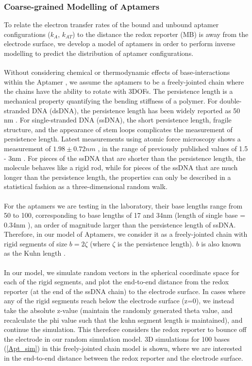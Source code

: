 \subsubsection{Coarse-grained Modelling of Aptamers}
To relate the electron transfer rates of the bound and unbound aptamer configurations ($k_{A}$, $k_{AT}$) to the distance the redox reporter (MB) is away from the electrode surface, we develop a model of aptamers in order to perform inverse modelling to predict the distribution of aptamer configurations.\\\\ 
Without considering chemical or thermodynamic effects of base-interactions within the Aptamer \cite{feigon1996aptamer}, we assume the aptamers to be a freely-jointed chain where the chains have the ability to rotate with 3DOFs.
The persistence length is a mechanical property quantifying the bending stiffness of a polymer. For double-stranded DNA (dsDNA), the persistence length has been widely reported as 50 nm \cite{bloomfielduniversity,marko1995stretching}. For single-stranded DNA (ssDNA), the short persistence length, fragile structure, and the appearance of stem loops complicates the measurement of persistence length. Latest measurements using atomic force microscopy shows a measurement of $1.98 \pm 0.72nm$ \cite{roth2018measuring}, in the range of previously published values of 1.5 - 3nm \cite{murphy2004probing,chi2013persistence}. For pieces of the ssDNA that are shorter than the persistence length, the molecule behaves like a rigid rod, while for pieces of the ssDNA that are much longer than the persistence length, the properties can only be described in a statistical fashion as a three-dimensional random walk.\\\\
For the aptamers we are testing in the laboratory, their base lengths range from 50 to 100, corresponding to base lengths of 17 and 34nm (length of single base = 0.34nm \cite{alberts2014molecular}), an order of magnitude larger than the persistence length of ssDNA. Therefore, in our model of Aptamers, we consider it as a freely-jointed chain with rigid segments of size $b = 2\zeta$ (where $\zeta$ is the persistence length). $b$ is also known as the Kuhn length \cite{strobl1997physics}.\\\\
In our model, we simulate random vectors in the spherical coordinate space for each of the rigid segments, and plot the end-to-end distance from the redox reporter (at the end of the ssDNA chain) to the electrode surface. In cases where any of the rigid segments reach below the electrode surface (z=0), we instead take the absolute z-value (maintain the randomly generated theta value, and recalculate the phi value such that the kuhn segment length is maintained), and continue the simulation. This therefore considers the redox reporter to bounce off the electrode in our random simulation model. 3D simulations for 100 bases (\autoref{Apt_sim}) in this freely-jointed chain model is shown, where we are interested in the end-to-end distance between the redox reporter and the electrode surface.\\\\
